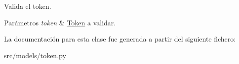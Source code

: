 Valida el token. 


\begin{DoxyParams}{Parámetros}
{\em token} & \hyperlink{classsrc_1_1models_1_1token_1_1_token}{Token} a validar. \\
\hline
\end{DoxyParams}


La documentación para esta clase fue generada a partir del siguiente fichero\-:\begin{DoxyCompactItemize}
\item 
src/models/token.\-py\end{DoxyCompactItemize}
